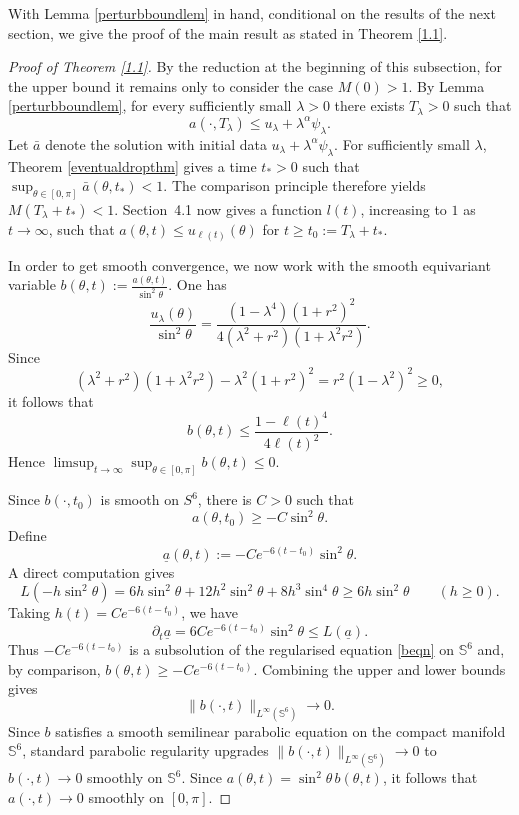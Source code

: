 \documentclass[11pt,a4paper]{article}
\numberwithin{equation}{section}
\theoremstyle{plain}
\theoremstyle{remark}
\begin{document}
With Lemma \ref{perturbboundlem} in hand, conditional on the results of the next section, we give the proof of the main result as stated in Theorem \ref{1.1}. 

\begin{proof}[Proof of Theorem \ref{1.1}]
By the reduction at the beginning of this subsection, for the upper bound it remains only to consider the
case $M(0)>1$. By Lemma \ref{perturbboundlem}, for every sufficiently small
$\lambda>0$ there exists $T_\lambda>0$ such that
$$
a(\cdot,T_\lambda)\leq u_\lambda+\lambda^\alpha\psi_\lambda.
$$
Let $\bar a$ denote the solution with initial data $u_\lambda+\lambda^\alpha\psi_\lambda$. For sufficiently small $\lambda$, Theorem \ref{eventualdropthm} gives a time
$t_*>0$ such that $\sup_{\theta\in[0,\pi]}\bar a(\theta,t_*)<1$. The comparison principle therefore yields $M(T_\lambda+t_*)<1$. Section~4.1 now gives a function $l(t)$, increasing to $1$ as $t\to\infty$, such that $a(\theta,t)\leq u_{\ell(t)}(\theta)$ for $t\geq t_0:=T_\lambda+t_*$.

In order to get smooth convergence, we now work with the smooth equivariant variable $b(\theta,t):=\frac{a(\theta,t)}{\sin^2\theta}$. One has
$$
\frac{u_\lambda(\theta)}{\sin^2\theta}
=
\frac{(1-\lambda^4)(1+r^2)^2}
{4(\lambda^2+r^2)(1+\lambda^2r^2)}.
$$
Since
$$
(\lambda^2+r^2)(1+\lambda^2r^2)
-
\lambda^2(1+r^2)^2
=
r^2(1-\lambda^2)^2\geq0,
$$
it follows that
$$
b(\theta,t)
\leq
\frac{1-\ell(t)^4}{4\ell(t)^2}.
$$
Hence 
$\limsup_{t\to\infty}
\sup_{\theta\in[0,\pi]}b(\theta,t)
\leq0$. 

Since $b(\cdot,t_0)$ is smooth on $S^6$, there is $C>0$ such
that
$$
a(\theta,t_0)\geq-C\sin^2\theta.
$$
Define
$$
\underline a(\theta,t)
:=
-Ce^{-6(t-t_0)}\sin^2\theta.
$$
A direct computation gives
$$
L(-h\sin^2\theta)
=
6h\sin^2\theta
+
12h^2\sin^2\theta
+
8h^3\sin^4\theta
\geq
6h\sin^2\theta
\qquad
(h\geq0).
$$
Taking $h(t)=Ce^{-6(t-t_0)}$, we have
$$
\partial_t\underline a
=
6Ce^{-6(t-t_0)}\sin^2\theta
\leq
L(\underline a).
$$
Thus $-Ce^{-6(t-t_0)}$ is a subsolution of the regularised equation \eqref{beqn} on $\mathbb S^6$ and, by comparison, $b(\theta,t)
\geq
-Ce^{-6(t-t_0)}$. Combining the upper and lower bounds gives
$$
\|b(\cdot,t)\|_{L^\infty(\mathbb S^6)}
\longrightarrow0.
$$
Since $b$ satisfies a smooth semilinear parabolic equation on the compact manifold $\mathbb S^6$, standard parabolic regularity upgrades $\|b(\cdot,t)\|_{L^\infty(\mathbb S^6)}\to0$ to $b(\cdot,t)\to0$ smoothly on $\mathbb S^6$. Since $a(\theta,t)=\sin^2\theta\,b(\theta,t)$, it follows that $a(\cdot,t)\to0$ smoothly on $[0,\pi]$.
\end{proof}
\end{document}
